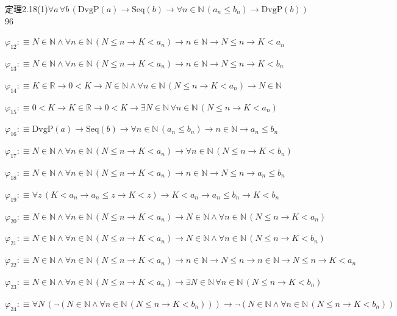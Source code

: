 \begin{fullproof}{定理2.18(1)}{$\forall a\,\forall b\,(\mathrm{DvgP}(a) \to \mathrm{Seq}(b) \to \forall n \in \mathbb{N}\,(a_{n} \leq b_{n}) \to \mathrm{DvgP}(b))$}{96}
\begin{abbrevlist}
\item $\varphi_{12} :\equiv N \in \mathbb{N} \land \forall n \in \mathbb{N}\,(N \leq n \to K < a_{n}) \to n \in \mathbb{N} \to N \leq n \to K < a_{n}$
\item $\varphi_{13} :\equiv N \in \mathbb{N} \land \forall n \in \mathbb{N}\,(N \leq n \to K < a_{n}) \to n \in \mathbb{N} \to N \leq n \to K < b_{n}$
\item $\varphi_{14} :\equiv K \in \mathbb{R} \to 0 < K \to N \in \mathbb{N} \land \forall n \in \mathbb{N}\,(N \leq n \to K < a_{n}) \to N \in \mathbb{N}$
\item $\varphi_{15} :\equiv 0 < K \to K \in \mathbb{R} \to 0 < K \to \exists N \in \mathbb{N}\,\forall n \in \mathbb{N}\,(N \leq n \to K < a_{n})$
\item $\varphi_{16} :\equiv \mathrm{DvgP}(a) \to \mathrm{Seq}(b) \to \forall n \in \mathbb{N}\,(a_{n} \leq b_{n}) \to n \in \mathbb{N} \to a_{n} \leq b_{n}$
\item $\varphi_{17} :\equiv N \in \mathbb{N} \land \forall n \in \mathbb{N}\,(N \leq n \to K < a_{n}) \to \forall n \in \mathbb{N}\,(N \leq n \to K < b_{n})$
\item $\varphi_{18} :\equiv N \in \mathbb{N} \land \forall n \in \mathbb{N}\,(N \leq n \to K < a_{n}) \to n \in \mathbb{N} \to N \leq n \to a_{n} \leq b_{n}$
\item $\varphi_{19} :\equiv \forall z\,(K < a_{n} \to a_{n} \leq z \to K < z) \to K < a_{n} \to a_{n} \leq b_{n} \to K < b_{n}$
\item $\varphi_{20} :\equiv N \in \mathbb{N} \land \forall n \in \mathbb{N}\,(N \leq n \to K < a_{n}) \to N \in \mathbb{N} \land \forall n \in \mathbb{N}\,(N \leq n \to K < a_{n})$
\item $\varphi_{21} :\equiv N \in \mathbb{N} \land \forall n \in \mathbb{N}\,(N \leq n \to K < a_{n}) \to N \in \mathbb{N} \land \forall n \in \mathbb{N}\,(N \leq n \to K < b_{n})$
\item $\varphi_{22} :\equiv N \in \mathbb{N} \land \forall n \in \mathbb{N}\,(N \leq n \to K < a_{n}) \to n \in \mathbb{N} \to N \leq n \to n \in \mathbb{N} \to N \leq n \to K < a_{n}$
\item $\varphi_{23} :\equiv N \in \mathbb{N} \land \forall n \in \mathbb{N}\,(N \leq n \to K < a_{n}) \to \exists N \in \mathbb{N}\,\forall n \in \mathbb{N}\,(N \leq n \to K < b_{n})$
\item $\varphi_{24} :\equiv \forall N\,(\neg (N \in \mathbb{N} \land \forall n \in \mathbb{N}\,(N \leq n \to K < b_{n}))) \to \neg (N \in \mathbb{N} \land \forall n \in \mathbb{N}\,(N \leq n \to K < b_{n}))$

\end{abbrevlist}
\end{fullproof}
